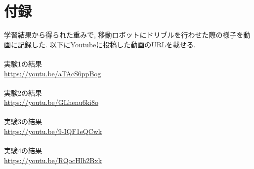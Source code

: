 \chapter*{付録}
%
学習結果から得られた重みで, 移動ロボットにドリブルを行わせた際の様子を動画に記録した. 以下にYoutubeに投稿した動画のURLを載せる.\\
%
\vspace{3.0zh}\\
%
実験1の結果\\
\url{https://youtu.be/aTAcS6ppBog} \\
\vspace{1.0zh}\\
実験2の結果\\
\url{https://youtu.be/GLhenu6ki8o} \\
\vspace{1.0zh}\\
実験3の結果\\
\url{https://youtu.be/9-IQF1eQCwk} \\
\vspace{1.0zh}\\
実験4の結果\\
\url{https://youtu.be/RQocHlh2Bxk} \\
\vspace{1.0zh}\\
